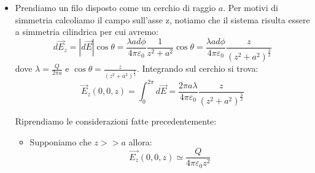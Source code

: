 \documentclass{book}
\begin{document}
\begin{itemize}
Analizziamo adesso dei casi particolari: 
\begin{itemize}
    \item Supponiamo che $z>>L$, ovvero che ci stiamo allontanando molto rispetto alla lunghezza del filo, allora il campo dovrebbe tendere a 0 (se $z \to \infty$). Ci aspettiamo inoltre che allontandoci il campo prodotto dal filo diventi quello di una carica puntiforme:
    $$
    \vec{E_z}(0,0,z) =  \frac{2 \lambda}{4 \pi \varepsilon_0} \frac{1}{z}  \frac{L}{\left( z^2 + L^2 \right)^{\frac{1}{2}}} \underbrace{\simeq}_{z \to \infty} \frac{Q}{4 \pi \varepsilon_0} \frac{1}{z^2}
    $$
    \item supponiamo adesso di avvicinarci al filo ($z<<L$):
    $$
    \vec{E_z}(0,0,z) =  \frac{2 \lambda}{4 \pi \varepsilon_0} \frac{1}{z}  \frac{L}{\left( z^2 + L^2 \right)^{\frac{1}{2}}} \simeq \frac{2L\lambda }{4\pi \varepsilon_0 z L} = \frac{\lambda}{2 \pi \varepsilon_0} \frac{1}{z}
    $$
    che risulta essere il campo di un filo elettrico che si estende all'infinito
\end{itemize}

\item  Prendiamo un filo disposto come un cerchio di raggio $a$.
Per motivi di simmetria calcoliamo il campo sull'asse z, notiamo che il sistema risulta essere a simmetria cilindrica per cui avremo: 
$$
d\vec{E}_z = |d\vec{E}| \cos{\theta} = \frac{\lambda a d\phi}{4 \pi \varepsilon_0} \frac{1}{z^2 + a^2} \cos{\theta} = \frac{ \lambda a d\phi}{4 \pi \varepsilon_0} \frac{z}{\left( z^2 + a^2 \right)^{\frac{3}{2}}}
$$
dove $\lambda= \frac{Q}{2 \pi a}$ e $\cos{\theta}= \frac{z}{\left(z^2+a^2 \right)^{\frac{1}{2}}}$. Integrando sul cerchio si trova:
$$
\vec{E}_z(0,0,z)= \int_0^{2\pi} d\vec{E}= \frac{2 \pi a \lambda}{4 \pi \varepsilon_0} \frac{z}{\left(z^2+a^2 \right)^{\frac{3}{2}}}
$$

Riprendiamo le considerazioni fatte precedentemente:
\begin{itemize}
    \item Supponiamo che $z>>a$ allora:
    $$
    \vec{E_z}(0,0,z) \simeq \frac{Q}{4\pi \varepsilon_0 z^2}
    $$
    

\end{itemize}
\end{itemize}
\end{document}
